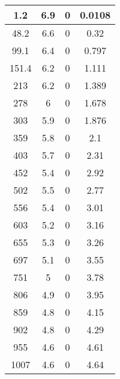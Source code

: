 \documentclass[12pt]{article}
\begin{document}
\begin{longtable}{|c|c|c|c|}
    1.2                     & 6.9               & 0                 & 0.0108             \\ \hline
    48.2                    & 6.6               & 0                 & 0.32               \\ \hline
    99.1                    & 6.4               & 0                 & 0.797              \\ \hline
    151.4                   & 6.2               & 0                 & 1.111              \\ \hline
    213                     & 6.2               & 0                 & 1.389              \\ \hline
    278                     & 6                 & 0                 & 1.678              \\ \hline
    303                     & 5.9               & 0                 & 1.876              \\ \hline
    359                     & 5.8               & 0                 & 2.1                \\ \hline
    403                     & 5.7               & 0                 & 2.31               \\ \hline
    452                     & 5.4               & 0                 & 2.92               \\ \hline
    502                     & 5.5               & 0                 & 2.77               \\ \hline
    556                     & 5.4               & 0                 & 3.01               \\ \hline
    603                     & 5.2               & 0                 & 3.16               \\ \hline
    655                     & 5.3               & 0                 & 3.26               \\ \hline
    697                     & 5.1               & 0                 & 3.55               \\ \hline
    751                     & 5                 & 0                 & 3.78               \\ \hline
    806                     & 4.9               & 0                 & 3.95               \\ \hline
    859                     & 4.8               & 0                 & 4.15               \\ \hline
    902                     & 4.8               & 0                 & 4.29               \\ \hline
    955                     & 4.6               & 0                 & 4.61               \\ \hline
    1007                    & 4.6               & 0                 & 4.64               \\ \hline
\end{longtable}\noindent
\end{document}

